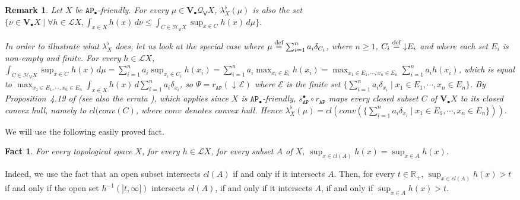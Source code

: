 \documentclass[preprint,12pt]{elsarticle}
\newcommand\eqdef{\mathrel{\buildrel \text{def}\over=}}
\newcommand{\Rp}{\mathbb{R}_+}
\DeclareMathOperator{\dc}{\downarrow\!}
\newcommand\Lform{\mathcal L}
\newcommand\Angel{{\mathtt{A}}}
\newcommand\Nature{{\mathtt{P}}}
\newcommand\AN{{\Angel\Nature}}
\newcommand\Smyth{{\mathcal Q}}
\newcommand\Hoare{{\mathcal H}}
\newcommand\Vt{\mathsf{V}}
\newcommand\HV{\Hoare_\Vt}
\newcommand\SV{\Smyth_{\Vt}}
\newcommand\Val{{\mathbf V}}
\newtheorem{fact}[theorem]{Fact}
\newtheorem{remark}[theorem]{Remark}
\begin{document}
\begin{remark}
  \label{rem:Psi}
  Let $X$ be $\AN_\bullet$-friendly.  For every
  $\mu \in \Val_\bullet {\SV X}$, $\lambda^\flat_X (\mu)$ is also the
  set
  $\{\nu \in \Val_\bullet X \mid \forall h \in \Lform X, \int_{x \in
    X} h (x) \,d\nu \leq \int_{C \in \HV X} \sup_{x \in C} h (x)
  \,d\mu\}$.

  In order to illustrate what ${\lambda^\flat_X}$ does, let us look at
  the special case where $\mu \eqdef \sum_{i=1}^n a_i \delta_{C_i}$,
  where $n \geq 1$, $C_i \eqdef \dc E_i$ and where each set $E_i$ is
  non-empty and finite.  For every $h \in \Lform X$,
  $\int_{C \in \HV X} \sup_{x \in C} h (x) \,d\mu = \sum_{i=1}^n a_i
  \sup_{x_i \in C_i} h (x_i) = \sum_{i=1}^n a_i \max_{x_i \in E_i} h
  (x_i) = \max_{x_1 \in E_1, \cdots, x_n \in E_n} \sum_{i=1}^n a_i h
  (x_i)$, which is equal to
  $\max_{x_1 \in E_1, \cdots, x_n \in E_n} \int_{x \in X} h (x)
  \,d\sum_{i=1}^n a_i \delta_{x_i}$, so
  $\Psi = r_\AN (\dc \mathcal E)$ where $\mathcal E$ is the finite set
  $\{\sum_{i=1}^n a_i \delta_{x_i} \mid x_1 \in E_1, \cdots, x_n \in
  E_n\}$.  By Proposition~4.19 of \cite{JGL-mscs16} (see also the
  errata \cite{JGL:mscs16:errata}), which applies since $X$ is
  $\AN_\bullet$-friendly, $s_\AN^\bullet \circ r_\AN$ maps every
  closed subset $C$ of $\Val_\bullet X$ to its closed convex hull,
  namely to $cl (conv (C)$, where $conv$ denotes convex hull.  Hence
  ${\lambda^\flat_X} (\mu) = cl (conv (\{\sum_{i=1}^n a_i \delta_{x_i}
  \mid x_1 \in E_1, \cdots, x_n \in E_n\}))$.
\end{remark}

We will use the following easily proved fact.
\begin{fact}
  \label{fact:sup:cl}
  For every topological space $X$, for every $h \in \Lform X$,
  for every subset $A$ of $X$, $\sup_{x \in cl (A)} h (x) = \sup_{x
    \in A} h (x)$.
\end{fact}
Indeed, we use the fact that an open subset intersects $cl (A)$ if and
only if it intersects $A$.  Then, for every $t \in \Rp$,
$\sup_{x \in cl (A)} h (x) > t$ if and only if the open set
$h^{-1} (]t, \infty])$ intersects $cl (A)$, if and only if it
intersects $A$, if and only if $\sup_{x \in A} h (x) > t$.
\end{document}
